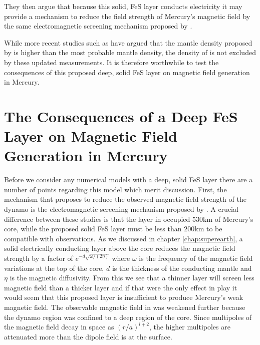 They then argue that because this solid, FeS layer conducts electricity it may provide a mechanism to reduce the field strength of Mercury's magnetic field by the same electromagnetic screening mechanism proposed by \citet{christensen06}. 

While more recent studies such as \citet{hauck2013} have argued that the mantle density proposed by \citet{smith2012} is higher than the most probable mantle density, the density of \citet{smith2012} is not excluded by these updated measurements. It is therefore worthwhile to test the consequences of this proposed deep, solid FeS layer on magnetic field generation in Mercury.

\section{The Consequences of a Deep FeS Layer on Magnetic Field Generation in Mercury}
Before we consider any numerical models with a deep, solid FeS layer there are a number of points regarding this model which merit discussion. First, the mechanism that \citet{smith2012} proposes to reduce the observed magnetic field strength of the dynamo is the electromagnetic screening mechanism proposed by \citet{christensen06}. A crucial difference between these studies is that the layer in \citet{christensen06} occupied $530\textrm{km}$ of Mercury's core, while the proposed solid FeS layer must be less than $200\textrm{km}$ to be compatible with observations. As we discussed in chapter \ref{chap:superearth}, a solid electrically conducting layer above the core reduces the magnetic field strength by a factor of $e^{-d\sqrt{\omega/(2 \eta)}}$ where $\omega$ is the frequency of the magnetic field variations at the top of the core, $d$ is the thickness of the conducting mantle and $\eta$ is the magnetic diffusivity. From this we see that a thinner layer will screen less magnetic field than a thicker layer and if that were the only effect in play it would seem that this proposed layer is insufficient to produce Mercury's weak magnetic field. The observable magnetic field in \citet{christensen06} was weakened further because the dynamo region was confined to a deep region of the core. Since multipoles of the magnetic field decay in space as $\left(r/a\right)^{l+2}$, the higher multipoles are attenuated more than the dipole field is at the surface. 

